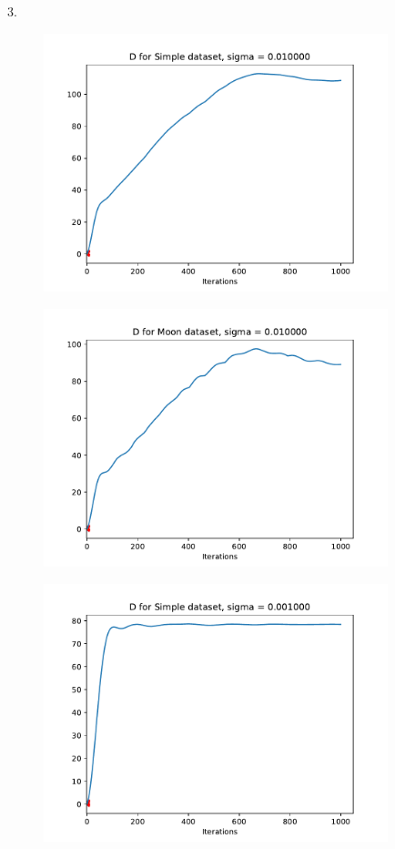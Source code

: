 \documentclass[english]{exercisesheet}
\begin{document}
 \begin{solution}3. 
 \begin{figure}[H]
        \centering
        \includegraphics[width=10cm]{simple_D_iterations_s0.01.pdf}
        \end{figure}
 \begin{figure}[H]
        \centering
        \includegraphics[width=10cm]{moon_D_iterations_s0.01.pdf}
        \end{figure}
 \begin{figure}[H]
        \centering
        \includegraphics[width=10cm]{simple_D_iterations.pdf}

\end{figure}
\end{solution}
\end{document}
